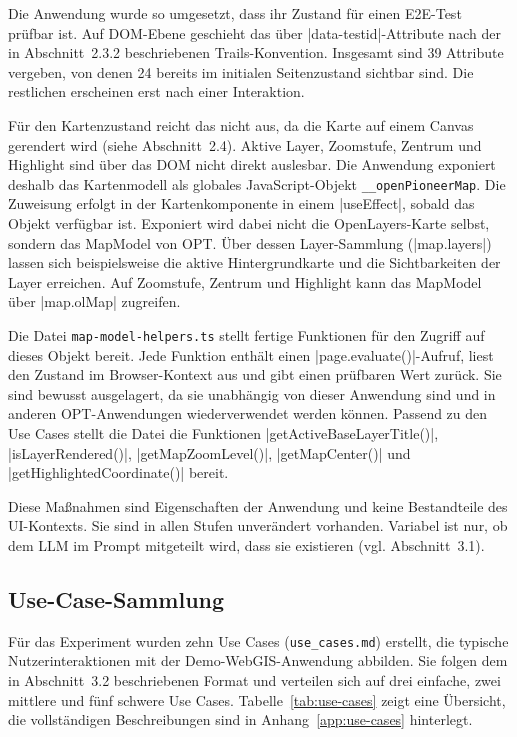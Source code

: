 Die Anwendung wurde so umgesetzt, dass ihr Zustand für einen \ac{E2E}-Test prüfbar ist. Auf \ac{DOM}-Ebene geschieht das über \code|data-testid|-Attribute nach der in Abschnitt~2.3.2 beschriebenen Trails-Konvention. Insgesamt sind 39 Attribute vergeben, von denen 24 bereits im initialen Seitenzustand sichtbar sind. Die restlichen erscheinen erst nach einer Interaktion.

Für den Kartenzustand reicht das nicht aus, da die Karte auf einem Canvas gerendert wird (siehe Abschnitt~2.4). Aktive Layer, Zoomstufe, Zentrum und Highlight sind über das \ac{DOM} nicht direkt auslesbar. Die Anwendung exponiert deshalb das Kartenmodell als globales JavaScript-Objekt \texttt{\_\_openPioneerMap}. Die Zuweisung erfolgt in der Kartenkomponente in einem \code|useEffect|, sobald das Objekt verfügbar ist. Exponiert wird dabei nicht die OpenLayers-Karte selbst, sondern das MapModel von \ac{OPT}. Über dessen Layer-Sammlung (\code|map.layers|) lassen sich beispielsweise die aktive Hintergrundkarte und die Sichtbarkeiten der Layer erreichen. Auf Zoomstufe, Zentrum und Highlight kann das MapModel über \code|map.olMap| zugreifen.

Die Datei \texttt{map-model-helpers.ts} stellt fertige Funktionen für den Zugriff auf dieses Objekt bereit. Jede Funktion enthält einen \code|page.evaluate()|-Aufruf, liest den Zustand im Browser-Kontext aus und gibt einen prüfbaren Wert zurück. Sie sind bewusst ausgelagert, da sie unabhängig von dieser Anwendung sind und in anderen \ac{OPT}-Anwendungen wiederverwendet werden können. Passend zu den Use Cases stellt die Datei die Funktionen \code|getActiveBaseLayerTitle()|, \code|isLayerRendered()|, \code|getMapZoomLevel()|, \code|getMapCenter()| und \code|getHighlightedCoordinate()| bereit.

Diese Maßnahmen sind Eigenschaften der Anwendung und keine Bestandteile des \ac{UI}-Kontexts. Sie sind in allen Stufen unverändert vorhanden. Variabel ist nur, ob dem \ac{LLM} im Prompt mitgeteilt wird, dass sie existieren (vgl. Abschnitt~3.1).

\subsection{Use-Case-Sammlung}

Für das Experiment wurden zehn Use Cases (\texttt{use\_cases.md}) erstellt, die typische Nutzerinteraktionen mit der Demo-WebGIS-Anwendung abbilden. Sie folgen dem in Abschnitt~3.2 beschriebenen Format und verteilen sich auf drei einfache, zwei mittlere und fünf schwere Use Cases. Tabelle~\ref{tab:use-cases} zeigt eine Übersicht, die vollständigen Beschreibungen sind in Anhang~\ref{app:use-cases} hinterlegt.

